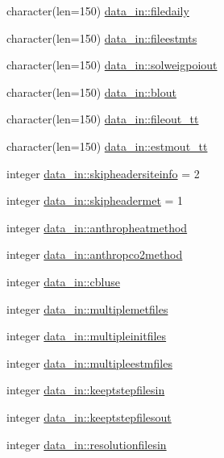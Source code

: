 \begin{DoxyCompactItemize}
character(len=150) \hyperlink{namespacedata__in_a46e1032d2b5b787e36c022a180204a49}{data\+\_\+in\+::filedaily}
\item 
character(len=150) \hyperlink{namespacedata__in_a01c2281eb3d97cb6f8fbd7b5e03d33e2}{data\+\_\+in\+::fileestmts}
\item 
character(len=150) \hyperlink{namespacedata__in_a08b0a2fffc34dcaefd3ef81483777e4e}{data\+\_\+in\+::solweigpoiout}
\item 
character(len=150) \hyperlink{namespacedata__in_ac7dd014c6f349ee2b4c385f79348fff4}{data\+\_\+in\+::blout}
\item 
character(len=150) \hyperlink{namespacedata__in_a0bc6e84d091c3af529338729ef26182a}{data\+\_\+in\+::fileout\+\_\+tt}
\item 
character(len=150) \hyperlink{namespacedata__in_ab3963c227716bf7ca52ecd4fcc7a8e67}{data\+\_\+in\+::estmout\+\_\+tt}
\item 
integer \hyperlink{namespacedata__in_a964397f0f83d198e4f674a85b7be941a}{data\+\_\+in\+::skipheadersiteinfo} = 2
\item 
integer \hyperlink{namespacedata__in_aea829593453d36d348e367b3238f63ea}{data\+\_\+in\+::skipheadermet} = 1
\item 
integer \hyperlink{namespacedata__in_a2d5ce0a221d7ee5c42ab2bdb3bf06a8b}{data\+\_\+in\+::anthropheatmethod}
\item 
integer \hyperlink{namespacedata__in_a6bf8149cf01d75c9bfb8b7aa575b98c3}{data\+\_\+in\+::anthropco2method}
\item 
integer \hyperlink{namespacedata__in_a0baf7befb79fdeb3a9b4a5107f64d25c}{data\+\_\+in\+::cbluse}
\item 
integer \hyperlink{namespacedata__in_a1de5c53755db8632301d4d1897f3ee8f}{data\+\_\+in\+::multiplemetfiles}
\item 
integer \hyperlink{namespacedata__in_ab28ac9ca6b8ed723ce3e74496158c5c8}{data\+\_\+in\+::multipleinitfiles}
\item 
integer \hyperlink{namespacedata__in_ad49de355a2aafe1ffbc40d2e91a12d87}{data\+\_\+in\+::multipleestmfiles}
\item 
integer \hyperlink{namespacedata__in_a66e75b7142f8d93aecf0a9c94a8a25d9}{data\+\_\+in\+::keeptstepfilesin}
\item 
integer \hyperlink{namespacedata__in_ab9a0f114993684cd73bedea082abe184}{data\+\_\+in\+::keeptstepfilesout}
\item 
integer \hyperlink{namespacedata__in_a0dfb19ee9c3d77d6a086f17b231d65b8}{data\+\_\+in\+::resolutionfilesin}
\item 

\end{DoxyCompactItemize}
